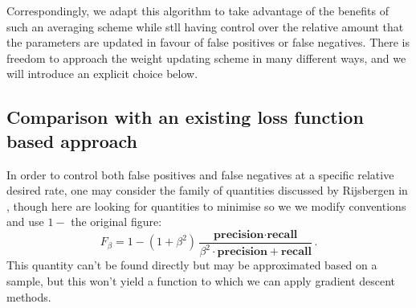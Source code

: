 \documentclass[10pt,a4paper]{article}
\begin{document}
\begin{figure}[H]
\end{figure}

Correspondingly, we adapt this algorithm to take advantage of the benefits of such an averaging scheme while stll having control over the relative amount that the parameters are updated in favour of false positives or false negatives.
There is freedom to approach the weight updating scheme in many different ways, and we will introduce an explicit choice below.


\subsection{Comparison with an existing loss function based approach}

In order to control both false positives and false negatives at a specific relative desired rate, one may consider the family of quantities discussed by Rijsbergen in \cite{van1979information}, though here are looking for quantities to minimise so we we modify conventions and use $1-$ the original figure:
$$
F_\beta=1-(1+\beta^2)\frac{\textbf{precision}\cdot\textbf{recall}}{\beta^2\cdot\textbf{precision}+\textbf{recall}}.
$$
This quantity can't be found directly but may be approximated based on a sample, but this won't yield a function to which we can apply gradient descent methods.
\end{document}
